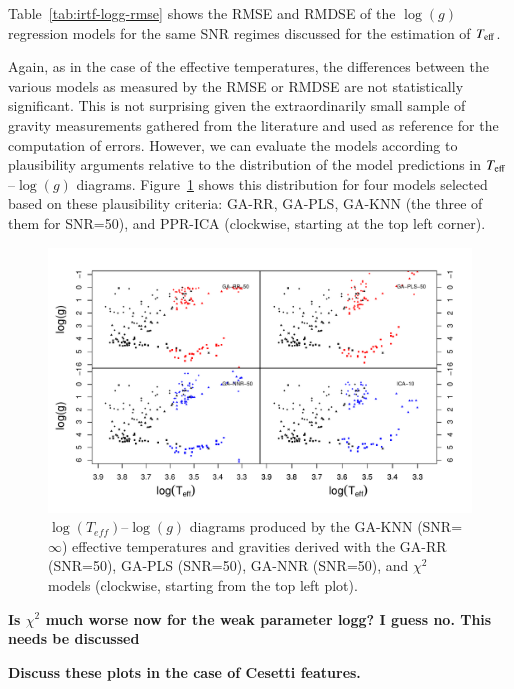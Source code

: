 Table~\ref{tab:irtf-logg-rmse} shows the RMSE and RMDSE of the
$\log(g)$ regression models for the same SNR regimes discussed for the
estimation of $T_{\rm eff}$.

Again, as in the case of the effective temperatures, the differences
between the various models as measured by the RMSE or RMDSE are not
statistically significant.  This is not surprising given the
extraordinarily small sample of gravity measurements gathered from the
literature and used as reference for the computation of errors.
However, we can evaluate the models according to plausibility
arguments relative to the distribution of the model predictions in
$T_{\rm eff}$--$\log(g)$ diagrams.  Figure~\ref{fig:lt_lg_ga} shows
this distribution for four models selected based on these plausibility
criteria: GA-RR, GA-PLS, GA-KNN (the three of them for SNR=50), and
PPR-ICA (clockwise, starting at the top left corner).

\begin{figure}
 \begin{center}
   \includegraphics[width=\textwidth]{figs/ordieres-fig4.pdf}
 \caption{$\log(T_{eff})$--$\log(g)$ diagrams produced by the GA-KNN
   (SNR=$\infty$) effective temperatures and gravities derived with
   the GA-RR (SNR=50), GA-PLS (SNR=50), GA-NNR (SNR=50), and $\chi^2$ models (clockwise, starting from
   the top left plot).}
 \label{fig:lt_lg_ga}
 \end{center}
\end{figure}

{\bf Is $\chi^2$ much worse now for the weak parameter logg? I guess
  no. This needs be discussed}

{\bf Discuss these plots in the case of Cesetti features.}


